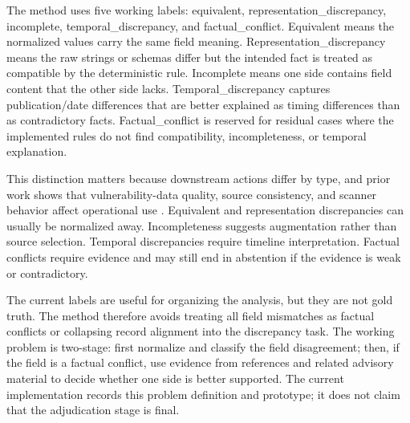 The method uses five working labels: equivalent, representation\_discrepancy, incomplete, temporal\_discrepancy, and factual\_conflict. Equivalent means the normalized values carry the same field meaning. Representation\_discrepancy means the raw strings or schemas differ but the intended fact is treated as compatible by the deterministic rule. Incomplete means one side contains field content that the other side lacks. Temporal\_discrepancy captures publication/date differences that are better explained as timing differences than as contradictory facts. Factual\_conflict is reserved for residual cases where the implemented rules do not find compatibility, incompleteness, or temporal explanation.

This distinction matters because downstream actions differ by type, and prior work shows that vulnerability-data quality, source consistency, and scanner behavior affect operational use \cite{NVDUsers2024,Churakova2026VEX,Mandl2026VulnDetection}. Equivalent and representation discrepancies can usually be normalized away. Incompleteness suggests augmentation rather than source selection. Temporal discrepancies require timeline interpretation. Factual conflicts require evidence and may still end in abstention if the evidence is weak or contradictory.

The current labels are useful for organizing the analysis, but they are not gold truth. The method therefore avoids treating all field mismatches as factual conflicts or collapsing record alignment into the discrepancy task. The working problem is two-stage: first normalize and classify the field disagreement; then, if the field is a factual conflict, use evidence from references and related advisory material to decide whether one side is better supported. The current implementation records this problem definition and prototype; it does not claim that the adjudication stage is final.
